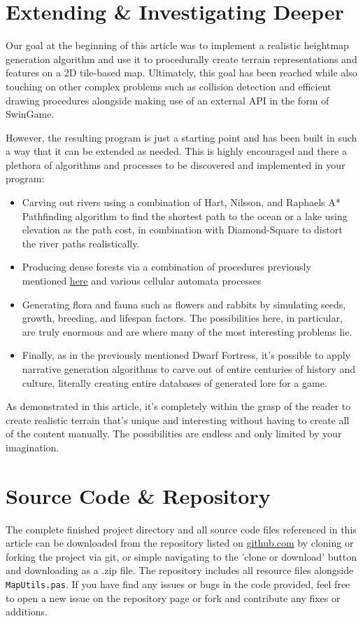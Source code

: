 \documentclass{article}
\begin{document}
\section{Extending \& Investigating Deeper}
Our goal at the beginning of this article was to implement a realistic heightmap generation algorithm and use it to procedurally create terrain representations and features on a 2D tile-based map. Ultimately, this goal has been reached while also touching on other complex problems such as collision detection and efficient drawing procedures alongside making use of an external API in the form of SwinGame.
\par
However, the resulting program is just a starting point and has been built in such a way that it can be extended as needed. This is highly encouraged and there a plethora of algorithms and processes to be discovered and implemented in your program:
\begin{itemize}
\item
Carving out rivers using a combination of Hart, Nilsson, and Raphaels A* Pathfinding algorithm \parencite{astar} to find the shortest path to the ocean or a lake using elevation as the path cost, in combination with Diamond-Square to distort the river paths realistically.
\item
Producing dense forests via a combination of procedures previously mentioned \hyperref[forestalgo]{here} and various cellular automata processes
\item
Generating flora and fauna such as flowers and rabbits by simulating seeds, growth, breeding, and lifespan factors. The possibilities here, in particular, are truly enormous and are where many of the most interesting problems lie.
\item
Finally, as in the previously mentioned Dwarf Fortress, it's possible to apply narrative generation algorithms to carve out of entire centuries of history and culture, literally creating entire databases of generated lore for a game.
\end{itemize}

As demonstrated in this article, it's completely within the grasp of the reader to create realistic terrain that's unique and interesting without having to create all of the content manually. The possibilities are endless and only limited by your imagination.

\printbibliography

\appendix
\setcounter{secnumdepth}{0}
\section{Source Code \& Repository}
The complete finished project directory and all source code files referenced in this article can be downloaded from the repository listed on \href{https://github.com/jacobmilligan/intro_hd_report}{github.com} by cloning or forking the project via git, or simple navigating to the 'clone or download' button and downloading as a .zip file. The repository includes all resource files alongside \\ \texttt{MapUtils.pas}. If you have find any issues or bugs in the code provided, feel free to open a new issue on the repository page or fork and contribute any fixes or additions.
\end{document}
